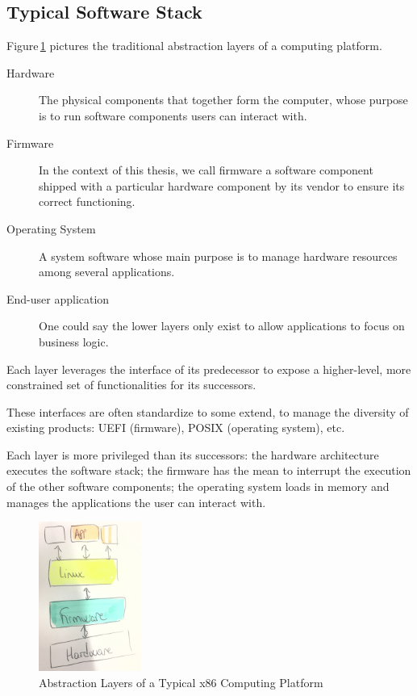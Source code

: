 \subsection{Typical Software Stack}

Figure\,\ref{fig:usecase:computing-platform-1} pictures the traditional
abstraction layers of a computing platform.

\begin{description}
\item [Hardware] The physical components that together form the computer, whose
  purpose is to run software components users can interact with.
%
\item [Firmware] In the context of this thesis, we call firmware a software
  component shipped with a particular hardware component by its vendor to ensure
  its correct functioning.
%
\item [Operating System] A system software whose main purpose is to manage
  hardware resources among several applications.
%
\item [End-user application] One could say the lower layers only exist to allow
  applications to focus on business logic.
\end{description}

Each layer leverages the interface of its predecessor to expose a higher-level,
more constrained set of functionalities for its successors.

These interfaces are often standardize to some extend, to manage the diversity
of existing products: UEFI (firmware), POSIX (operating system), etc.

Each layer is more privileged than its successors:
%
the hardware architecture executes the software stack;
%
the firmware has the mean to interrupt the execution of the other software
components;
%
the operating system loads in memory and manages the applications the user can
interact with.

\begin{figure}
  \centering
  \includegraphics[width=0.3\textwidth]{Figures/computing-platform-1.jpg}
  \caption{Abstraction Layers of a Typical x86 Computing Platform}
  \label{fig:usecase:computing-platform-1}
\end{figure}

